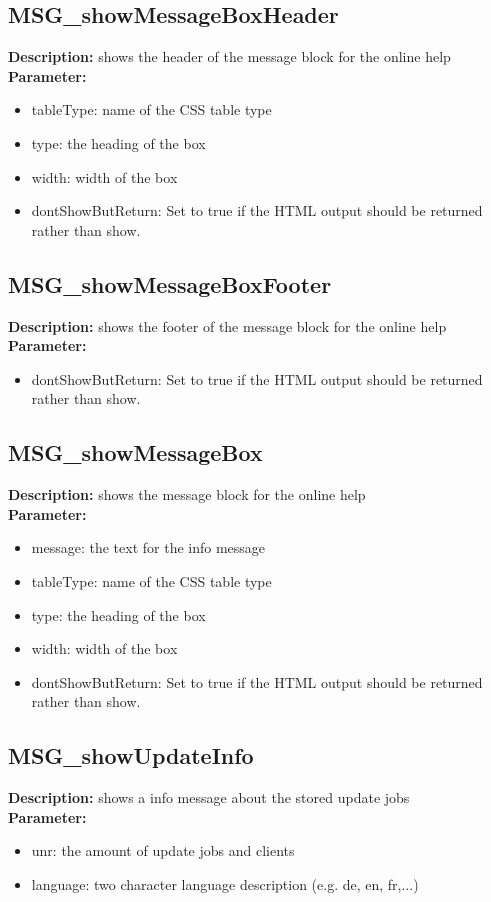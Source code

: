 \subsection{MSG\_showMessageBoxHeader}
\textbf{Description:} shows the header of the message block for the online help\\
\textbf{Parameter:}
\begin{itemize}
\item tableType: name of the CSS table type
\item type: the heading of the box
\item width: width of the box
\item dontShowButReturn: Set to true if the HTML output should be returned rather than show.
\end{itemize}

\subsection{MSG\_showMessageBoxFooter}
\textbf{Description:} shows the footer of the message block for the online help\\
\textbf{Parameter:}
\begin{itemize}
\item dontShowButReturn: Set to true if the HTML output should be returned rather than show.
\end{itemize}

\subsection{MSG\_showMessageBox}
\textbf{Description:} shows the message block for the online help\\
\textbf{Parameter:}
\begin{itemize}
\item message: the text for the info message
\item tableType: name of the CSS table type
\item type: the heading of the box
\item width: width of the box
\item dontShowButReturn: Set to true if the HTML output should be returned rather than show.
\end{itemize}

\subsection{MSG\_showUpdateInfo}
\textbf{Description:} shows a info message about the stored update jobs\\
\textbf{Parameter:}
\begin{itemize}
\item unr: the amount of update jobs and clients
\item language: two character language description (e.g. de, en, fr,...)
\end{itemize}

